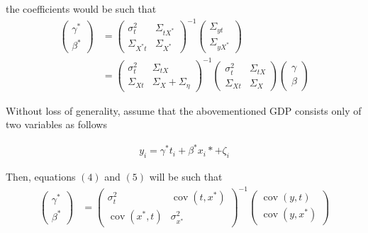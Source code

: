 \documentclass[12pt]{article}
\begin{document}
the coefficients would be such that
\begin{align}
    \left(\begin{array}{l}
{\gamma}^* \\
{\beta}^*
\end{array}\right)&=\left(\begin{array}{cc}
{\sigma}^2_{t} & \Sigma_{tX^*} \\
\Sigma_{X^*t} & {\Sigma}_{X^*}
\end{array}\right)^{-1}\left(\begin{array}{c}
\Sigma_{yt} \\
\Sigma_{yX^*}
\end{array}\right) \\
& =\left(\begin{array}{cc}
{\sigma}^2_{t} & \Sigma_{tX} \\
\Sigma_{Xt} & {\Sigma}_{X}+{\Sigma}_{\eta}
\end{array}\right)^{-1}\left(\begin{array}{cc}
{\sigma}^2_{t} & \Sigma_{tX} \\
\Sigma_{Xt} & {\Sigma}_{X}
\end{array}\right)\left(\begin{array}{l}
{\gamma} \\
{\beta}
\end{array}\right)
\end{align}

Without loss of generality, assume that the abovementioned GDP consists only of two variables as follows

	 \begin{align}
            y_i = \gamma^* t_i +  \beta^*x_i* + \zeta_i
        \end{align}

	Then, equations $(4)$ and $(5)$ will be such that
	\begin{align}
            \left(\begin{array}{l}
        {\gamma}^* \\
        {\beta}^*
        \end{array}\right)&=\left(\begin{array}{cc}
        {\sigma}^2_{t} & \operatorname{cov}({t,x^*}) \\
        \operatorname{cov}({x^*,t}) & {\sigma}_{x^*}^2
        \end{array}\right)^{-1}\left(\begin{array}{c}
        \operatorname{cov}{(y,t)} \\
        \operatorname{cov}{(y,x^*)}
        \end{array}\right) \\
        \end{align}
	
\end{document}
